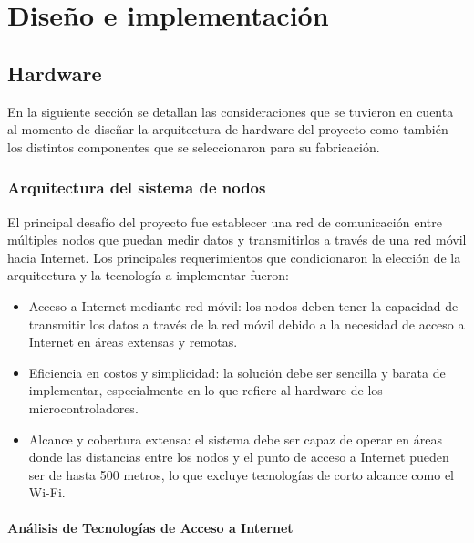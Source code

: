 \chapter{Diseño e implementación} %
\label{ChapterDisenoImplementacion} 





\section{Hardware}
En la siguiente sección se detallan las consideraciones que se tuvieron en cuenta al momento de diseñar la arquitectura de hardware del proyecto como también los distintos componentes que se seleccionaron para su fabricación. 

\subsection{Arquitectura del sistema de nodos}
\label{sec:arquitecturahardware}

El principal desafío del proyecto fue establecer una red de comunicación entre múltiples nodos que puedan medir datos y transmitirlos a través de una red móvil hacia Internet. Los principales requerimientos que condicionaron la elección de la arquitectura y la tecnología a implementar fueron:

\begin{itemize}
    \item Acceso a Internet mediante red móvil: los nodos deben tener la capacidad de transmitir los datos a través de la red móvil debido a la necesidad de acceso a Internet en áreas extensas y remotas. 
    \item Eficiencia en costos y simplicidad: la solución debe ser sencilla y barata de implementar, especialmente en lo que refiere al hardware de los microcontroladores.
    \item Alcance y cobertura extensa: el sistema debe ser capaz de operar en áreas donde las distancias entre los nodos y el punto de acceso a Internet pueden ser de hasta 500 metros, lo que excluye tecnologías de corto alcance como el Wi-Fi.
\end{itemize}


\subsubsection{Análisis de Tecnologías de Acceso a Internet}

